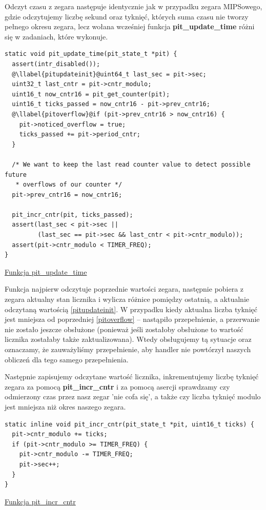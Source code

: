 \documentclass[shortabstract]{iithesis}
\makeatletter
\theoremstyle{definition} \newtheorem*{definition}{Definicja}
\theoremstyle{definition} \newtheorem*{example}{Przykład}
\theoremstyle{definition} \newtheorem*{remark}{Uwaga}
\newenvironment{longlisting}{\captionsetup{type=listing}}{}
\newcounter{llabel}[listing]%
\renewcommand*{\thellabel}{%
    \ifnum\value{llabel}<0 %
      \@ctrerr
    \else
      \ifnum\value{llabel}>10 %
        \@ctrerr
      \else
        \protect\ding{\the\numexpr\value{llabel}+201\relax}%
      \fi
    \fi
  }%
\newlength{\llabelsep}
\newcommand*{\llabel}[1]{%
  \begingroup
  \refstepcounter{llabel}%
  \label{#1}%
  \llap{\thellabel\kern\llabelsep}%
  \endgroup
}
\makeatother
\begin{document}
Odczyt czasu z zegara następuje identycznie jak w przypadku zegara MIPSowego, gdzie odczytujemy liczbę sekund oraz tyknięć, których suma czasu nie tworzy pełnego okresu zegara, lecz wołana wcześniej funkcja \textbf{pit\_update\_time} różni się w zadaniach, które wykonuje.

\begin{longlisting}
  \begin{verbatim}
static void pit_update_time(pit_state_t *pit) {
  assert(intr_disabled());
  @\llabel{pitupdateinit}@uint64_t last_sec = pit->sec;
  uint32_t last_cntr = pit->cntr_modulo;
  uint16_t now_cntr16 = pit_get_counter(pit);
  uint16_t ticks_passed = now_cntr16 - pit->prev_cntr16;
  @\llabel{pitoverflow}@if (pit->prev_cntr16 > now_cntr16) {
    pit->noticed_overflow = true;
    ticks_passed += pit->period_cntr;
  }

  /* We want to keep the last read counter value to detect possible future
   * overflows of our counter */
  pit->prev_cntr16 = now_cntr16;

  pit_incr_cntr(pit, ticks_passed);
  assert(last_sec < pit->sec ||
         (last_sec == pit->sec && last_cntr < pit->cntr_modulo));
  assert(pit->cntr_modulo < TIMER_FREQ);
}
  \end{verbatim}
  \caption{\href{https://mimiker.ii.uni.wroc.pl/source/xref/mimiker/sys/drv/pit.c?r=2609772a\#49}{Funkcja pit\_update\_time}}
  \label{lst:funcpitupdatetimer}
\end{longlisting}

Funkcja najpierw odczytuje poprzednie wartości zegara, następnie pobiera z zegara aktualny stan licznika i wylicza różnice pomiędzy ostatnią, a aktualnie odczytaną wartością \ref{pitupdateinit}. W przypadku kiedy aktualna liczba tyknięć jest mniejsza od poprzedniej \ref{pitoverflow} -- nastąpiło przepełnienie, a przerwanie nie zostało jeszcze obsłużone (ponieważ jeśli zostałoby obsłużone to wartość licznika zostałaby także zaktualizowana). Wtedy obsługujemy tą sytuacje oraz oznaczamy, że zauważyliśmy przepełnienie, aby handler nie powtórzył naszych obliczeń dla tego samego przepełnienia.

Następnie zapisujemy odczytane wartość licznika, inkrementujemy liczbę tyknięć zegara za pomocą \textbf{pit\_incr\_cntr} i za pomocą asercji sprawdzamy czy odmierzony czas przez nasz zegar 'nie cofa się', a także czy liczba tyknięć modulo jest mniejsza niż okres naszego zegara.

\begin{longlisting}
  \begin{verbatim}
static inline void pit_incr_cntr(pit_state_t *pit, uint16_t ticks) {
  pit->cntr_modulo += ticks;
  if (pit->cntr_modulo >= TIMER_FREQ) {
    pit->cntr_modulo -= TIMER_FREQ;
    pit->sec++;
  }
}
  \end{verbatim}
  \caption{\href{https://mimiker.ii.uni.wroc.pl/source/xref/mimiker/sys/drv/pit.c?r=2609772a\#41}{Funkcja pit\_incr\_cntr}}
  \label{lst:funcpitincrticks}
\end{longlisting}
\end{document}
